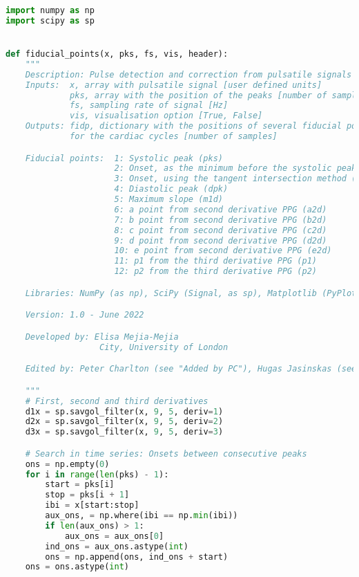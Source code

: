 \begin{lstlisting}[language=Python,label={lst:fidp.py}, basicstyle=\scriptsize]
import numpy as np
import scipy as sp


def fiducial_points(x, pks, fs, vis, header):
    """
    Description: Pulse detection and correction from pulsatile signals
    Inputs:  x, array with pulsatile signal [user defined units]
             pks, array with the position of the peaks [number of samples]
             fs, sampling rate of signal [Hz]
             vis, visualisation option [True, False]
    Outputs: fidp, dictionary with the positions of several fiducial points
             for the cardiac cycles [number of samples]

    Fiducial points:  1: Systolic peak (pks)
                      2: Onset, as the minimum before the systolic peak (ons)
                      3: Onset, using the tangent intersection method (ti)
                      4: Diastolic peak (dpk)
                      5: Maximum slope (m1d)
                      6: a point from second derivative PPG (a2d)
                      7: b point from second derivative PPG (b2d)
                      8: c point from second derivative PPG (c2d)
                      9: d point from second derivative PPG (d2d)
                      10: e point from second derivative PPG (e2d)
                      11: p1 from the third derivative PPG (p1)
                      12: p2 from the third derivative PPG (p2)

    Libraries: NumPy (as np), SciPy (Signal, as sp), Matplotlib (PyPlot, as plt)

    Version: 1.0 - June 2022

    Developed by: Elisa Mejia-Mejia
                   City, University of London

    Edited by: Peter Charlton (see "Added by PC"), Hugas Jasinskas (see "Adjusted by HJ")

    """
    # First, second and third derivatives
    d1x = sp.savgol_filter(x, 9, 5, deriv=1)
    d2x = sp.savgol_filter(x, 9, 5, deriv=2)
    d3x = sp.savgol_filter(x, 9, 5, deriv=3)

    # Search in time series: Onsets between consecutive peaks
    ons = np.empty(0)
    for i in range(len(pks) - 1):
        start = pks[i]
        stop = pks[i + 1]
        ibi = x[start:stop]
        aux_ons, = np.where(ibi == np.min(ibi))
        if len(aux_ons) > 1:
            aux_ons = aux_ons[0]
        ind_ons = aux_ons.astype(int)
        ons = np.append(ons, ind_ons + start)
    ons = ons.astype(int)


\end{lstlisting}
